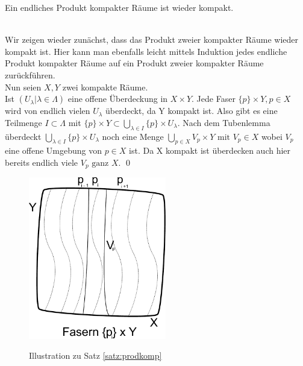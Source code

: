 \begin{Satz}\label{satz:prodkomp}
	Ein endliches Produkt kompakter Räume ist wieder kompakt.
\end{Satz}
	\\
	Wir zeigen wieder zunächst, dass das Produkt zweier kompakter Räume wieder kompakt ist. Hier kann man ebenfalls leicht mittels Induktion jedes endliche Produkt kompakter Räume 
	auf ein Produkt zweier kompakter Räume zurückführen. \\
	Nun seien \(X, Y\) zwei kompakte Räume.\\
	Ist \((U_{\lambda} | \lambda \in \Lambda) \) eine offene Überdeckung in \(X \times Y \). Jede Faser \( \{p\} \times Y, p \in X \) wird von endlich vielen \(U_{\lambda} \) überdeckt,
	da Y kompakt ist. Also gibt es eine Teilmenge \( I \subset \Lambda \) mit \( \{p\} \times Y \subset \bigcup_{ \lambda \in I } \{p\} \times U_{\lambda} \). 
	Nach dem Tubenlemma überdeckt \( \bigcup_{ \lambda \in I } \{p\} \times U_{\lambda} \) noch eine Menge \(\bigcup_{ p \in X } V_{p} \times Y \mbox{ mit } V_{p} \in X \) 
	wobei \( V_{p} \) eine offene Umgebung von \( p \in X \) ist. Da X kompakt ist überdecken auch hier bereits endlich viele \(V_{p} \mbox{ ganz } X \). 
\qed

\begin{figure}[ht]
	\centering
	\includegraphics[width=6cm]{produkt_kompakter_raueme.pdf}
	\label{fig:satzprodkomp}
	\caption{Illustration zu Satz \ref{satz:prodkomp}}
\end{figure}
	
